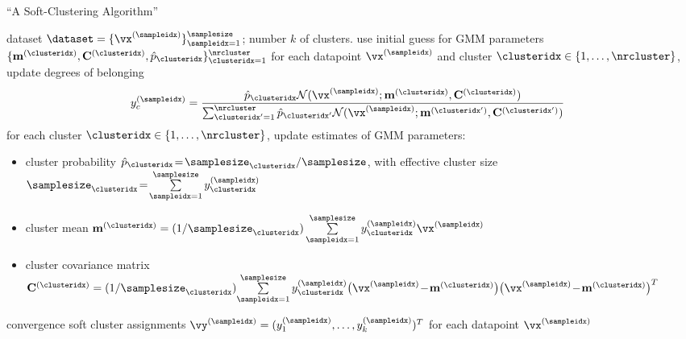\documentclass[12pt]{report}
\begin{document}
\begin{algorithm}[htbp]
\caption{``A Soft-Clustering Algorithm'' \cite{BishopBook}}\label{alg:softclustering}

\begin{algorithmic}[1]
\renewcommand{\algorithmicrequire}{\textbf{Input:}}
\renewcommand{\algorithmicensure}{\textbf{Output:}}
\Require   dataset $\dataset=\{ \vx^{(\sampleidx)}\}_{\sampleidx=1}^{\samplesize}$; number $k$ of clusters. 
\Statex\hspace{-6mm}{\bf Initialize:} use initial guess for GMM parameters $\{\mathbf{m}^{(\clusteridx)},\mathbf{C}^{(\clusteridx)},\hat{p}_{\clusteridx}\}_{\clusteridx=1}^{\nrcluster}$ 
\Repeat
\vspace*{2mm}
\State for each datapoint $\vx^{(\sampleidx)}$ and cluster $\clusteridx \in \{1,\ldots,\nrcluster\}$, update degrees of belonging
\vspace*{-1mm}
\begin{align}
\label{equ_update_soft_cluster_assignm}
y_{c}^{(\sampleidx)} & =  \frac{\hat{p}_{\clusteridx} \mathcal{N}(\vx^{(\sampleidx)};\mathbf{m}^{(\clusteridx)},\mathbf{C}^{(\clusteridx)})}{\sum_{\clusteridx'=1}^{\nrcluster} \hat{p}_{\clusteridx'}\mathcal{N}(\vx^{(\sampleidx)};\mathbf{m}^{(\clusteridx')},\mathbf{C}^{(\clusteridx')})} %
\end{align}
\State for each cluster $\clusteridx \in \{1,\ldots,\nrcluster\}$, update estimates of GMM parameters: 
\begin{itemize} 
\item cluster probability $\hat{p}_{\clusteridx}\!=\!\samplesize_{\clusteridx}/\samplesize$, with effective cluster size $\samplesize_{\clusteridx}\!=\!\sum\limits_{\sampleidx=1}^{\samplesize} y_{\clusteridx}^{(\sampleidx)}$
\item cluster mean $\mathbf{m}^{(\clusteridx)} = (1/\samplesize_{\clusteridx}) \sum\limits_{\sampleidx=1}^{\samplesize} y_{\clusteridx}^{(\sampleidx)} \vx^{(\sampleidx)}$ 
\item cluster covariance matrix $\mathbf{C}^{(\clusteridx)}  = (1/\samplesize_{\clusteridx}) {\sum\limits_{\sampleidx=1}^{\samplesize} y_{\clusteridx}^{(\sampleidx)} \big(\vx^{(\sampleidx)}\!-\!\mathbf{m}^{(\clusteridx)}\big)   \big(\vx^{(\sampleidx)}\!-\!\mathbf{m}^{(\clusteridx)}\big)^{T} }$
\end{itemize}
\vspace*{1mm}
\Until convergence \label{equ_conv_soft_clustering_algo}
\Ensure soft cluster assignments $\vy^{(\sampleidx)}=(y_{1}^{(\sampleidx)},\ldots,y_{k}^{(\sampleidx)})^{T}$ for each datapoint $\vx^{(\sampleidx)}$ 
\end{algorithmic}
\end{algorithm}
\end{document}
